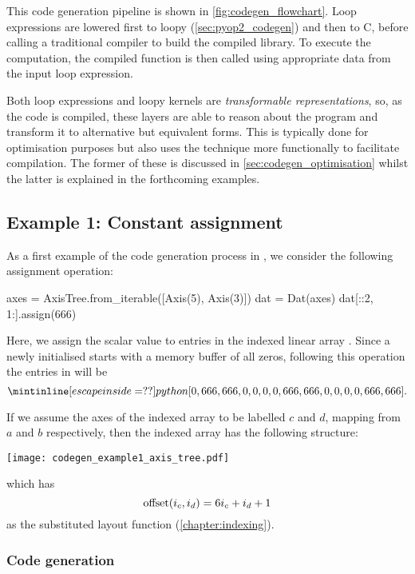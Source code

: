 \documentclass[thesis]{subfiles}
\begin{document}
This code generation pipeline is shown in \cref{fig:codegen_flowchart}.
Loop expressions are lowered first to loopy (\cref{sec:pyop2_codegen}) and then to C, before calling a traditional compiler to build the compiled library.
To execute the computation, the compiled function is then called using appropriate data from the input loop expression.

Both  loop expressions and loopy kernels are \emph{transformable representations}, so, as the code is compiled, these layers are able to reason about the program and transform it to alternative but equivalent forms.
This is typically done for optimisation purposes but  also uses the technique more functionally to facilitate compilation.
The former of these is discussed in \cref{sec:codegen_optimisation} whilst the latter is explained in the forthcoming examples.

\subsection{Example 1: Constant assignment}
\label{sec:example1_assign}

As a first example of the code generation process in , we consider the following assignment operation:
\begin{pyinline}
  axes = AxisTree.from_iterable([Axis(5), Axis(3)])
  dat = Dat(axes)
  dat[::2, 1:].assign(666)
\end{pyinline}
Here, we assign the scalar value  to entries in the indexed linear array .
Since a newly initialised  starts with a memory buffer of all zeros, following this operation the entries in  will be
\begin{equation}
  \pycode{[0, 666, 666, 0, 0, 0, 0, 666, 666, 0, 0, 0, 0, 666, 666]}.
\end{equation}

If we assume the axes of the indexed array to be labelled $c$ and $d$, mapping from $a$ and $b$ respectively, then the indexed array has the following structure:
\begin{center}
  \texttt{[image: codegen\_example1\_axis\_tree.pdf]}
\end{center}
which has
\begin{equation}
  \textnormal{offset}(i_c, i_d) = 6 i_c + i_d + 1
\end{equation}
as the substituted layout function (\cref{chapter:indexing}).

\subsubsection{Code generation}
\end{document}
